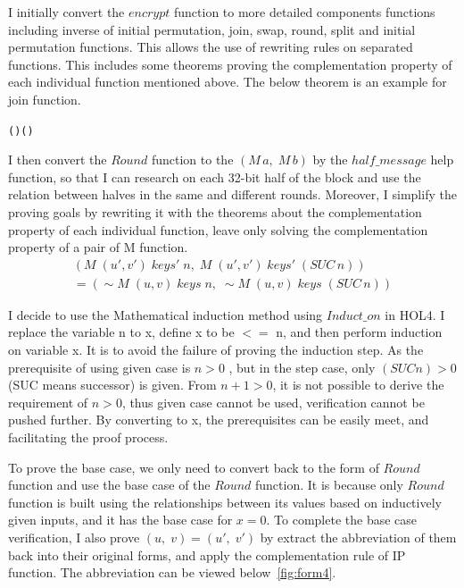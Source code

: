 \documentclass{article}
\begin{document}
I initially convert the $encrypt$ function to more detailed components functions including inverse of initial permutation,
join, swap, round, split and initial permutation functions. This allows the use of rewriting rules on separated
functions. This includes some theorems proving the complementation property of each individual function mentioned above.
The below theorem is an example for join function.

\begin{alltt}
   \HOLTokenTurnstile{}  (\HOLSymConst{\HOLTokenNeg{}}\HOLSymConst{,}\HOLSymConst{\HOLTokenNeg{}}) \HOLSymConst{=} \HOLSymConst{\HOLTokenNeg{}} (\HOLSymConst{,})
\end{alltt}

I then convert the $Round$ function to the $(M \,a,\; M \,b)$ by the $half\_message$ help function, so that I can research on each 32-bit
half of the block and use the relation between halves in the same and different rounds. Moreover, I simplify the proving goals by rewriting it with the theorems about the complementation
property of each individual function, leave only solving the complementation property of a pair of M function.
\begin{multline}
(M \; (u', v') \; keys' \; n, \; M \; (u', v') \; keys' \; (SUC \, n)) \\
= (\sim M \; (u, v) \; keys \; n, \; \sim M \; (u, v) \; keys \; (SUC \, n))
\end{multline}

I decide to use the Mathematical induction method using $Induct\_on$ in HOL4. I replace the variable n to x, define x to be $<=$ n, and then
perform induction on variable x. It is to avoid the failure of proving the induction step. As the prerequisite of using
given case is $n>0$ , but in the step case, only $(SUC n) > 0$ (SUC means successor) is given. From $n+1 > 0$, it is not possible to
derive the requirement of $n > 0$, thus given case cannot be used, verification cannot be pushed further. By converting to x,
the prerequisites can be easily meet, and facilitating the proof process.

To prove the base case, we only need to convert back to the form of $Round$ function and use the base case of the $Round$ function.
It is because only $Round$ function is built using the relationships between its values based on inductively given inputs, and
it has the base case for $x=0$. To complete the
base case verification, I also prove $(u,\;v)= (u',\;v')$ by extract the abbreviation of them back into their original forms, and apply the complementation rule of
IP function. The abbreviation can be viewed below~\ref{fig:form4}.
\end{document}
